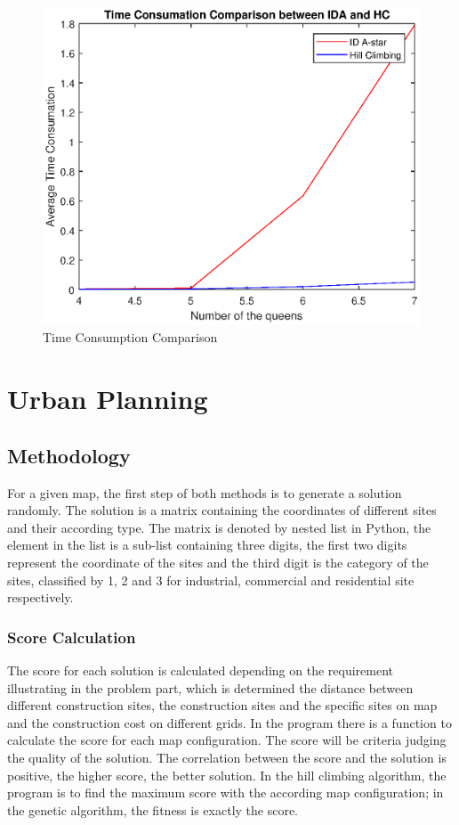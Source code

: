 \documentclass[11pt, a4paper]{article}
\begin{document}
\begin{figure}[htbp]
	\centering 
	\includegraphics[scale=0.3]{com}
	\caption{Time Consumption Comparison } %
\end{figure}


\section{Urban Planning}

\subsection{Methodology}

For a given map, the first step of both methods is to generate a solution randomly. The solution is a matrix containing the coordinates of different sites and their according type. The matrix is denoted by nested list in Python, the element in the list is a sub-list containing three digits, the first two digits represent the coordinate of the sites and the third digit is the category of the sites, classified by 1, 2 and 3 for industrial, commercial and residential site respectively. 

\subsubsection{Score Calculation}

The score for each solution is calculated depending on the requirement illustrating in the problem part, which is determined the distance between different construction sites, the construction sites and the specific sites on map and the construction cost on different grids. In the program there is a function to calculate the score for each map configuration.
The score will be criteria judging the quality of the solution. The correlation between the score and the solution is positive, the higher score, the better solution. In the hill climbing algorithm, the program is to find the maximum score with the according map configuration; in the genetic algorithm, the fitness is exactly the score.
\end{document}
